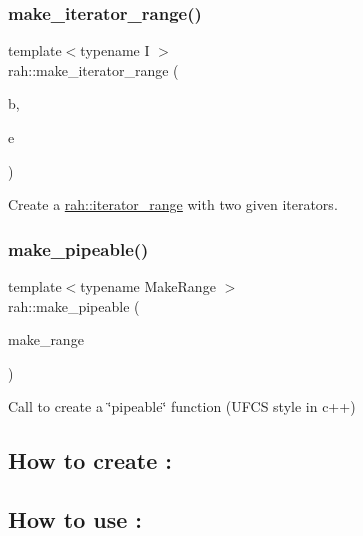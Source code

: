\subsubsection{\texorpdfstring{make\_iterator\_range()}{make\_iterator\_range()}}
{\footnotesize\ttfamily template$<$typename I $>$ \\
rah\+::make\+\_\+iterator\+\_\+range (\begin{DoxyParamCaption}\item[{I}]{b,  }\item[{I}]{e }\end{DoxyParamCaption})}



Create a \mbox{\hyperlink{structrah_1_1iterator__range}{rah\+::iterator\+\_\+range}} with two given iterators. 

\mbox{\label{namespacerah_a274b78c4c0af5dd58ce280f02223fb55}} 
\subsubsection{\texorpdfstring{make\_pipeable()}{make\_pipeable()}}
{\footnotesize\ttfamily template$<$typename Make\+Range $>$ \\
rah\+::make\+\_\+pipeable (\begin{DoxyParamCaption}\item[{Make\+Range \&\&}]{make\+\_\+range }\end{DoxyParamCaption})}



Call to create a \char`\"{}pipeable\char`\"{} function (U\+F\+CS style in c++) 

\hypertarget{namespacerah_create_pipeable}{}\subsection{How to create \+:}\label{namespacerah_create_pipeable}

\begin{DoxyCodeInclude}{0}
\DoxyCodeLine{\{}
\DoxyCodeLine{\}}
\end{DoxyCodeInclude}
\hypertarget{namespacerah_use_pipeable}{}\subsection{How to use \+:}\label{namespacerah_use_pipeable}


